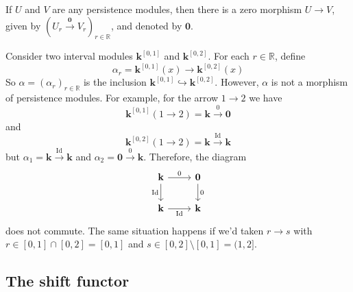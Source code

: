 \documentclass[11pt]{article}
\begin{document}

\begin{example}

If \(U\) and \(V\) are any persistence modules,
then there is a zero morphism \(U\to V\), given by 
$(  U_r\xrightarrow{\mathbf{0}} V_r)_{r\in\mathbb{R}} $, 
and denoted by $\mathbf{0}$.
\end{example}

\begin{example}
Consider two interval modules \(\mathbf{k}^{[0,1]}\) and \(\mathbf{k}^{[0,2]}\).
For each \(r\in \mathbb{R}\), define 
$$
\alpha_r = \mathbf{k}^{[0,1]}(x)\to\mathbf{k}^{[0,2]}(x)
$$
So \(\alpha=(\alpha_r)_{r\in\mathbb{R}}\) is the inclusion 
\(\mathbf{k}^{[0,1]}\hookrightarrow\mathbf{k}^{[0,2]}\).
However, \(\alpha\) is not a morphism of persistence modules.
For example, for the arrow \(1\to 2\) we have 
$$
\mathbf{k}^{[0,1]}(1\to 2) = \mathbf{k}\xrightarrow{\mathrm{0}} \mathbf{0}
$$
and 
$$
\mathbf{k}^{[0,2]}(1\to 2) = \mathbf{k}\xrightarrow{\mathrm{Id}} \mathbf{k}
$$
but \(\alpha_1 = \mathbf{k}\xrightarrow{\mathrm{Id}} \mathbf{k}\) and 
$\alpha_2 = \mathbf{0}\xrightarrow{\mathrm{0}} \mathbf{k}$.
Therefore, the diagram 
$$
\begin{tikzcd}
\mathbf{k} \arrow[r, "0"] \arrow[d, "\mathrm{Id}"'] & \mathbf{0} \arrow[d, "0"] \\
\mathbf{k} \arrow[r, "\mathrm{Id}"']                & \mathbf{k}               
\end{tikzcd}
$$
does not commute.
The same situation happens if we'd taken 
\(r\to s\) with \(r\in [0,1]\cap [0,2]=[0,1]\) and \(s\in [0,2]\setminus [0,1]=(1,2]\).
\end{example}


\subsection{The shift functor}
\end{document}
